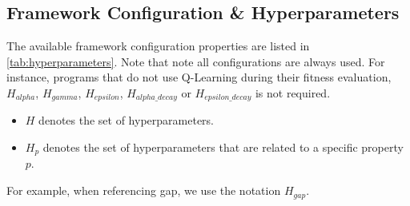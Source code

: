 \documentclass[12pt]{report}
\begin{document}
\subsection{Framework Configuration \& Hyperparameters}

The available framework configuration properties are listed in \ref{tab:hyperparameters}. Note that note all configurations are always used.
For instance, programs that do not use Q-Learning during their fitness evaluation, $H_{alpha}$, $H_{gamma}$, $H_{epsilon}$, $H_{alpha\_decay}$ or $H_{epsilon\_decay}$ is not required.
\begin{itemize}
	\item $H$ denotes the set of hyperparameters.
	\item $H_{p}$ denotes the set of hyperparameters that are related to a specific property $p$.
\end{itemize}
For example, when referencing gap, we use the notation $H_{gap}$.
\end{document}
